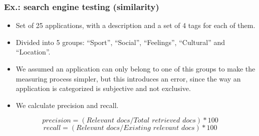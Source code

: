 \begin{frame}

	\frametitle{Ex.: search engine testing (similarity)} 

	\begin{itemize}
	    \item Set of 25 applications, with a description and a set of 4 tags
	    for each of them.
	    \item Divided into 5 groups: ``Sport'', ``Social'', ``Feelings'',
	    ``Cultural'' and ``Location''.
	    \item We assumed an application can only belong to one of this groups
	    to make the measuring process simpler, but this introduces an error, since the way an application is categorized is
		subjective and not exclusive. 
		\item We calculate precision and recall.
    \end{itemize}
    
    \[precision = (Relevant\phantom{i}docs/Total\phantom{i}retrieved\phantom{i}docs)*100\]
	\[recall = (Relevant\phantom{i}docs/Existing\phantom{i}relevant\phantom{i}docs)*100\]
\end{frame}


